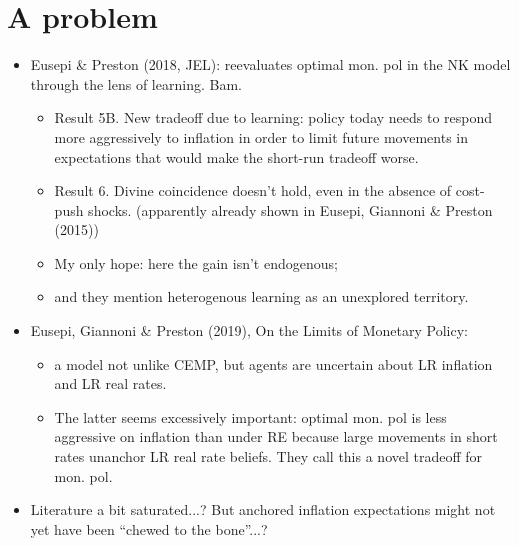 \documentclass[11pt]{article}
\renewcommand{\[}{\begin{equation}}
\renewcommand{\]}{\end{equation}}
\begin{document}
\section{A problem}
\begin{itemize}
\item Eusepi \& Preston (2018, JEL): reevaluates optimal mon. pol in the NK model through the lens of learning. Bam. 
\begin{itemize}
\item Result 5B. New tradeoff due to learning: policy today needs to respond more aggressively to inflation in order to limit future movements in expectations that would make the short-run tradeoff worse. 
\item Result 6. Divine coincidence doesn't hold, even in the absence of cost-push shocks. (apparently already shown in Eusepi, Giannoni \& Preston (2015))
\item My only hope:  here the gain isn't endogenous;
\item and they mention heterogenous learning as an unexplored territory.
\end{itemize}
\item Eusepi, Giannoni \& Preston (2019), On the Limits of Monetary Policy:
\begin{itemize}
\item a model not unlike CEMP, but agents are uncertain about LR inflation and LR real rates. 
\item The latter seems excessively important: optimal mon. pol is less aggressive on inflation than under RE because large movements in short rates unanchor LR real rate beliefs. They call this a novel tradeoff for mon. pol. 
\end{itemize}
\item Literature a bit saturated...? But anchored inflation expectations might not yet have been ``chewed to the bone''...?
\end{itemize}



 
\end{document}

